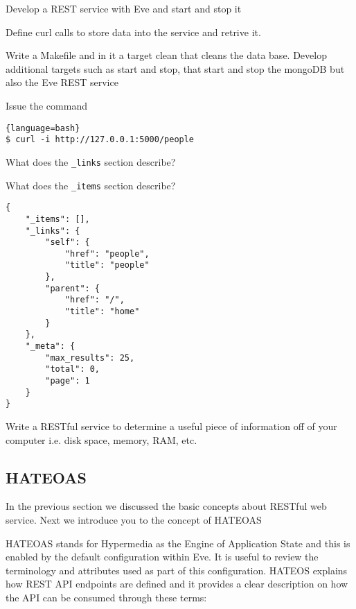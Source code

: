 \begin{exercise}
Develop a REST service with Eve and start and stop it
\end{exercise}

\begin{exercise}
Define curl calls to store data into the service and retrive it.
\end{exercise}

\begin{exercise}
Write a Makefile and in it a target clean that cleans the data
base. Develop additional targets such as start and stop, that start
and stop the mongoDB but also the Eve REST service
\end{exercise}


\begin{exercise}
Issue the command

\begin{lstlisting}{language=bash}
$ curl -i http://127.0.0.1:5000/people
\end{lstlisting}

What does the \verb|_links| section describe?

What does the \verb|_items| section describe?

\begin{lstlisting}
{
    "_items": [],
    "_links": {
        "self": {
            "href": "people",
            "title": "people"
        },
        "parent": {
            "href": "/",
            "title": "home"
        }
    },
    "_meta": {
        "max_results": 25,
        "total": 0,
        "page": 1
    }
}
\end{lstlisting} 
\end{exercise}


\begin{exercise}
Write a RESTful service to determine a useful piece of information off
of your computer i.e. disk space, memory, RAM, etc.
\end{exercise}


\subsection{HATEOAS}\label{s:hateoas}

In the previous section we discussed the basic concepts about RESTful
web service. Next we introduce you to the concept of HATEOAS

HATEOAS stands for Hypermedia as the Engine of Application State and
this is enabled by the default configuration within Eve. It is useful
to review the terminology and attributes used as part of this
configuration. HATEOS explains how REST API endpoints are defined and it
provides a clear description on how the API can be consumed through
these terms:

